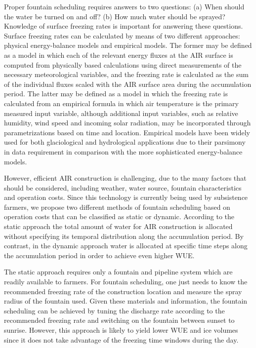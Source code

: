 \documentclass[utf8]{frontiersSCNS}
\begin{document}
Proper fountain scheduling requires answers to two questions: (a) When should the water be turned on and off?
(b) How much water should be sprayed? Knowledge of surface freezing rates is important for answering these
questions. Surface freezing rates can be calculated by means of two different approaches: physical
energy-balance models and empirical models. The former may be defined as a model in which each of the relevant
energy fluxes at the AIR surface is computed from physically based calculations using direct measurements of the
necessary meteorological variables, and the freezing rate is calculated as the sum of the individual fluxes
scaled with the AIR surface area during the accumulation period. The latter may be defined as a model in which
the freezing rate is calculated from an empirical formula in which air temperature is the primary measured input
variable, although additional input variables, such as relative humidity, wind speed and incoming solar
radiation, may be incorporated through parametrizations based on time and location. Empirical models have been
widely used for both glaciological and hydrological applications due to their parsimony in data requirement in
comparison with the more sophisticated energy-balance models.

However, efficient AIR construction is challenging, due to the many factors that should be considered, including
weather, water source, fountain characteristics and operation costs. Since this technology is currently being
used by subsistence farmers, we propose two different methods of fountain scheduling based on operation costs
that can be classified as static or dynamic. According to the static approach the total amount of water for AIR
construction is allocated without specifying its temporal distribution along the accumulation period. By
contrast, in the dynamic approach water is allocated at specific time steps along the accumulation period in
order to achieve even higher WUE.

The static approach requires only a fountain and pipeline system which are readily available to farmers. For
fountain scheduling, one just needs to know the recommended freezing rate of the construction location and
measure the spray radius of the fountain used. Given these materials and information, the fountain scheduling
can be achieved by tuning the discharge rate according to the recommended freezing rate and switching on the
fountain between sunset to sunrise. However, this approach is likely to yield lower WUE and ice volumes since it
does not take advantage of the freezing time windows during the day.
\end{document}
